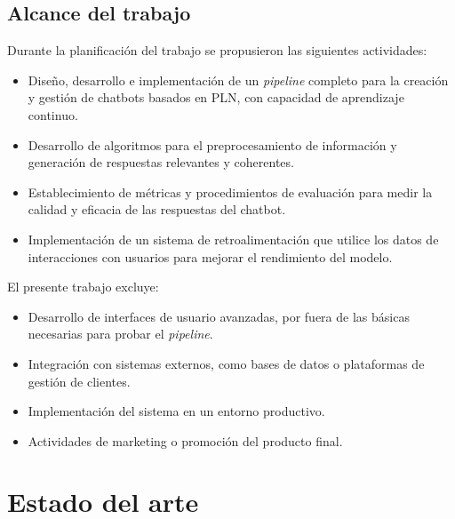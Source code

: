 \newpage %
\subsection{Alcance del trabajo}

Durante la planificación del trabajo se propusieron las siguientes actividades:

\begin{itemize}
    \item Diseño, desarrollo e implementación de un \textit{pipeline} completo para la creación y gestión de chatbots basados en PLN, con capacidad de aprendizaje continuo.
    \item Desarrollo de algoritmos para el preprocesamiento de información y generación de respuestas relevantes y coherentes.
    \item Establecimiento de métricas y procedimientos de evaluación para medir la calidad y eficacia de las respuestas del chatbot.
    \item Implementación de un sistema de retroalimentación que utilice los datos de interacciones con usuarios para mejorar el rendimiento del modelo.
\end{itemize}

\vspace{0.5cm} %

El presente trabajo excluye: 
\begin{itemize}
    \item Desarrollo de interfaces de usuario avanzadas, por fuera de las básicas necesarias para probar el \textit{pipeline}.
    \item Integración con sistemas externos, como bases de datos o plataformas de gestión de clientes.
    \item Implementación del sistema en un entorno productivo.
    \item Actividades de marketing o promoción del producto final.
\end{itemize}


 


 

\section{Estado del arte}

